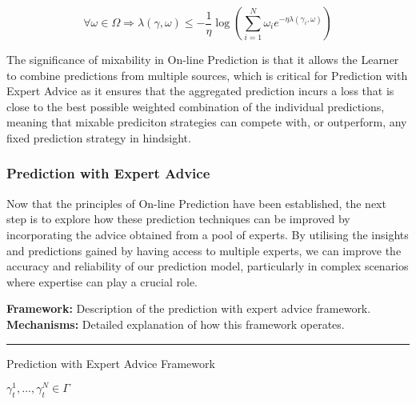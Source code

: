 \begin{equation}
    \forall\omega \in \Omega \Rightarrow \lambda(\gamma, \omega) \leq -\frac{1}{\eta}\log(\overset{N}{\underset{i=1}{\sum}} \omega_i e^{-\eta\lambda(\gamma_i, \omega)})
\end{equation}

The significance of mixability in On-line Prediction is that it allows the Learner to combine predictions from multiple sources, which is critical for Prediction with Expert Advice as it ensures that the aggregated prediction incurs a loss that is close to the best possible weighted combination of the individual predictions, meaning that mixable prediciton strategies can compete with, or outperform, any fixed prediction strategy in hindsight.

\subsubsection{Prediction with Expert Advice}
Now that the principles of On-line Prediction have been established, the next step is to explore how these prediction techniques can be improved by incorporating the advice obtained from a pool of experts. By utilising the insights and predictions gained by having access to multiple experts, we can improve the accuracy and reliability of our prediction model, particularly in complex scenarios where expertise can play a crucial role.

\textbf{Framework:} Description of the prediction with expert advice framework.\newline
\textbf{Mechanisms:} Detailed explanation of how this framework operates.\newline
\noindent\rule{\textwidth}{0.1pt}
\begin{protocol}[H]
    \caption{Prediction with Expert Advice Framework}\label{prediction_with_expert_advice_framework}
    \begin{algorithmic}[1]
        $\gamma^1_t, \ldots, \gamma^N_t \in \Gamma$
    \end{algorithmic}
\end{protocol}

